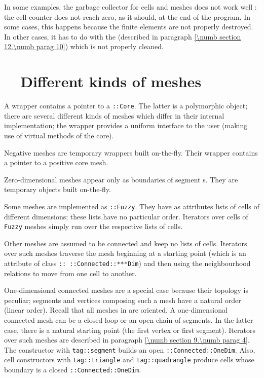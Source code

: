In some examples, the garbage collector for cells and meshes does not work well :
the cell counter does not reach zero, as it should, at the end of the program.
In some cases, this happens because the finite elements are not properly destroyed.
In other cases, it has to do with the {\small\tt{}} (described in
paragraph \ref{\numb section 12.\numb parag 10}) which is not properly cleaned.


\section{~~Different kinds of meshes}\label{\numb section 11.\numb parag 6}   

A {\small\tt{}} wrapper contains a pointer to a {\small\tt{}::Core}.
The latter is a polymorphic object; there are several different kinds of meshes
which differ in their internal implementation; the wrapper provides a uniform interface
to the user (making use of virtual methods of the core).

Negative meshes are temporary wrappers built on-the-fly.
Their wrapper contains a pointer to a positive core mesh.

Zero-dimensional meshes appear only as boundaries of segment {\small\tt{}}s.
They are temporary objects built on-the-fly.

Some meshes are implemented as {\small\tt{}::Fuzzy}.
They have as attributes lists of cells of different dimensions;
these lists have no particular order.
Iterators over cells of {\small\tt Fuzzy} meshes simply run over the respective lists of cells.

Other meshes are assumed to be connected and keep no lists of cells.
Iterators over such meshes traverse the mesh beginning at a starting point (which is an attribute
of class {\small\tt{}:: ::Connected::***Dim}) and then using the neighbourhood relations
to move from one cell to another.

One-dimensional connected meshes are a special case because their topology is peculiar;
segments and vertices composing such a mesh have a natural order (linear order).
Recall that all meshes in {\maniFEM} are oriented.
A one-dimensional connected mesh can be a closed loop or an open chain of segments.
In the latter case, there is a natural starting point (the first vertex or first segment).
Iterators over such meshes are described in paragraph \ref{\numb section 9.\numb parag 4}.
The {\small\tt{}} constructor with {\small\tt \textcolor{tag}{tag}::segment}
builds an open {\small\tt{}::Connected::OneDim}.
Also, cell constructors with {\small\tt \textcolor{tag}{tag}::triangle} and
{\small\tt \textcolor{tag}{tag}::quadrangle} produce cells
whose boundary is a closed {\small\tt{}::Connected::OneDim}.

